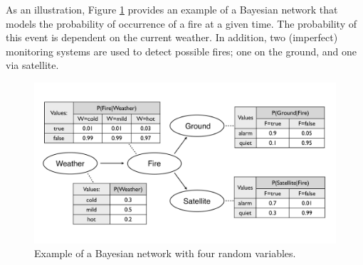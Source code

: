 As an illustration, Figure \ref{fig:plainbn} provides an example of a Bayesian network that models the probability of occurrence of a fire at a given time.  The probability of this event is dependent on the current weather.  In addition, two (imperfect) monitoring systems are used to detect possible fires; one on the ground, and one via satellite.  

\begin{figure}[h]
\centering
\includegraphics[scale=0.25]{imgs/plainbn.pdf}
\caption{Example of a Bayesian network with four random variables.}
\label{fig:plainbn}
\end{figure}


